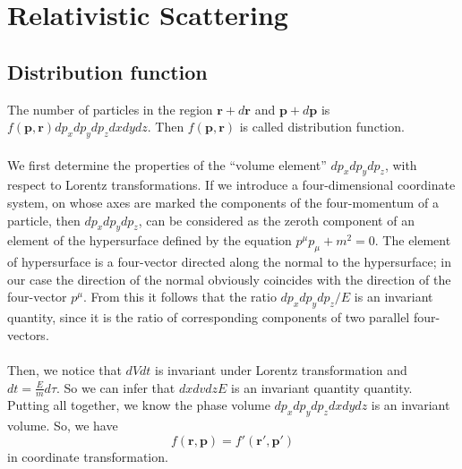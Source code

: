 \section{Relativistic Scattering}
\subsection{Distribution function}
The number of particles in the region $\bm{r}+d\bm{r}$ and $\bm{p} + d\bm{p}$ is $f(\bm{p},\bm{r})dp_x dp_y dp_z dx dy dz$. Then  $f(\bm{p},\bm{r})$ is called distribution function.
\\ \\
We first determine the properties of the ``volume element'' $dp_x dp_y dp_z$, with respect to Lorentz transformations. If we introduce a four-dimensional coordinate system, on whose axes are marked the components of the four-momentum of a particle, then $dp_x dp_y dp_z$, can be considered as the zeroth component of an element of the hypersurface defined by the equation $p^{\mu}p_{\mu} + m^2 = 0$. The element of hypersurface is a four-vector directed along the normal to the hypersurface; in our case the direction of the normal obviously coincides with the direction of the four-vector $p^{\mu}$. From this it follows that the ratio $dp_x dp_y dp_z / E$
is an invariant quantity, since it is the ratio of corresponding components of two parallel four-vectors.
\\ \\
Then, we notice that $dVdt$ is invariant under Lorentz transformation and $dt = \frac{E}{m} d\tau $. So we can infer that $dx dv dz E$
is an invariant quantity quantity. 
Putting all together, we know the phase volume $dp_x dp_y dp_z dx dy dz$ is an invariant volume.
So, we have
\[f(\bm{r},\bm{p}) = f'(\bm{r}',\bm{p}')\]
in coordinate transformation.

